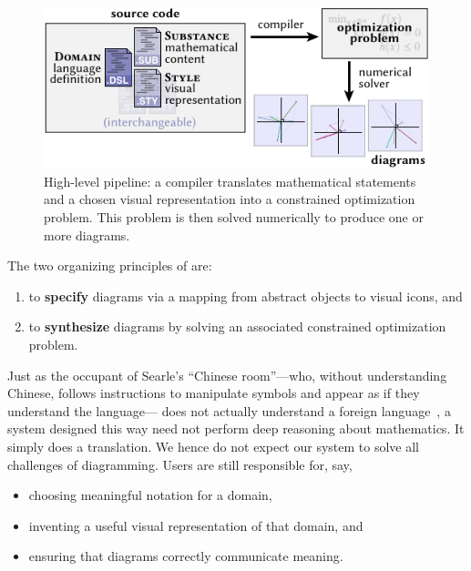 \begin{figure}[t]
   \centering
   \begin{minipage}[c]{.35\linewidth}
       \caption{High-level pipeline: a compiler translates mathematical statements and a chosen visual representation into a constrained optimization problem.  This problem is then solved numerically to produce one or more diagrams.\label{fig:HighLevelPipeline}}
   \end{minipage}\hfill
   \begin{minipage}[c]{.60\linewidth}
       \includegraphics[width=\linewidth]{assets/penrose/HighLevelPipeline.pdf}
   \end{minipage}\hfill
   \vspace{-\baselineskip}
\end{figure}


\vspace{.5\baselineskip}\begin{mdframed}
The two organizing principles of \Penrose{} are:
   \begin{enumerate}[label=(\roman*)]
      \item to \textbf{specify} diagrams via a mapping from abstract objects to visual icons, and
      \item to \textbf{synthesize} diagrams by solving an associated constrained optimization problem.
   \end{enumerate}
\end{mdframed}\vspace{.5\baselineskip}


Just as the occupant of Searle's ``Chinese room''---who, without understanding Chinese, follows instructions to manipulate symbols and appear as if they understand the language--- does not actually understand a foreign language~\cite{Cole:2014:CRA}, a system designed this way need not perform deep reasoning about mathematics. It simply does a translation.  We hence do not expect our system to solve all challenges of diagramming. Users are still responsible for, say,
\begin{itemize}
   \item choosing meaningful notation for a domain,
   \item inventing a useful visual representation of that domain, and
   \item ensuring that diagrams correctly communicate meaning.
\end{itemize}


